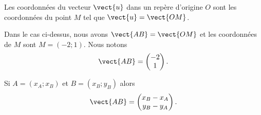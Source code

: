 \begin{multicols}{2}
    \begin{definition}
        Les coordonnées du vecteur \( \vect{ u }\) dans un repère d'origine \( O\) sont les coordonnées du point \( M\) tel que \( \vect{ u }=\vect{ OM }\).
    \end{definition}

    \columnbreak

    \begin{center}

    \end{center}
\end{multicols}
Dans le cas ci-dessus, nous avons \( \vect{ AB }=\vect{ OM }\) et les coordonnées de \( M\) sont \( M=(-2;1)\). Nous notons
\begin{equation}
    \vect{ AB }=\begin{pmatrix}
        -2    \\ 
        1    
    \end{pmatrix}.
\end{equation}

\begin{Aretenir}
    \begin{multicols}{2}
    Si \( A=(x_A;x_B)\) et \( B=(x_B;y_B)\) alors
    \begin{equation}
        \vect{ AB }=\begin{pmatrix}
            x_B-x_A    \\ 
            y_B-y_A    
        \end{pmatrix}.
    \end{equation}

    \columnbreak

    \begin{center}

    \end{center}

    \end{multicols}
\end{Aretenir}

